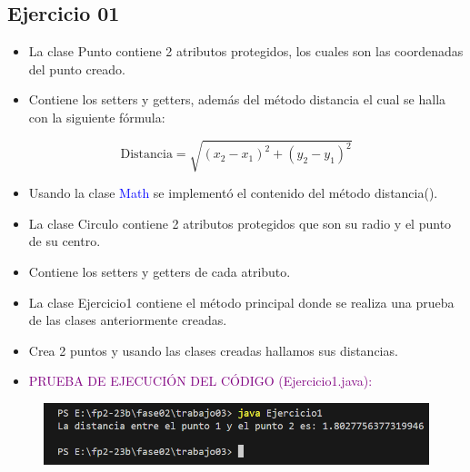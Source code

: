 \documentclass{article}
\begin{document}


\subsection{Ejercicio 01}


    \begin{itemize}
        \item La clase Punto contiene 2 atributos protegidos, los cuales son las coordenadas del punto creado.
        \item Contiene los setters y getters, además del método distancia el cual se halla con la siguiente fórmula:
    \end{itemize}
    \[
    \text{Distancia} = \sqrt{{(x_2 - x_1)^2 + (y_2 - y_1)^2}}
    \]
    \begin{itemize}
        \item Usando la clase \textcolor{blue}{Math} se implementó el contenido del método distancia().
    \end{itemize}
    


    \begin{itemize}
        \item La clase Circulo contiene 2 atributos protegidos que son su radio y el punto de su centro.
        \item Contiene los setters y getters de cada atributo.
    \end{itemize}
    

    
    \begin{itemize}
        \item La clase Ejercicio1 contiene el método principal donde se realiza una prueba de las clases anteriormente creadas.
        \item Crea 2 puntos y usando las clases creadas hallamos sus distancias.
    \end{itemize}
    


    \begin{itemize}
        \item \textcolor{purple}{PRUEBA DE EJECUCIÓN DEL CÓDIGO (Ejercicio1.java):}
    \end{itemize}
    \begin{figure}[H]
        \centering
        \includegraphics[width=1
        \textwidth,keepaspectratio]{img/Ejercicio1_prueba.png}
    \end{figure}
\end{document}
